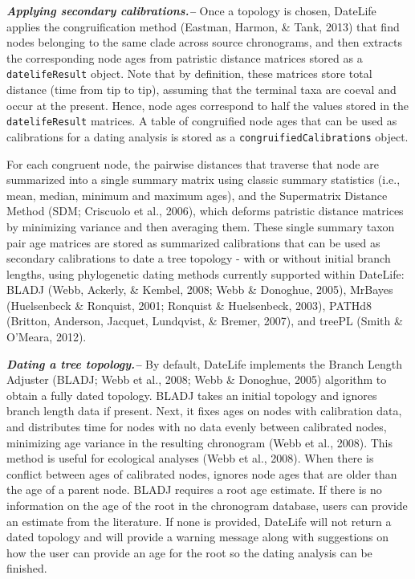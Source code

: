 \documentclass[english,man]{apa6}
\begin{document}
\emph{\textbf{Applying secondary calibrations.--}}
Once a topology is chosen, DateLife applies the congruification method (Eastman, Harmon, \& Tank, 2013) that find nodes belonging to the same clade across source chronograms, and then extracts the corresponding node ages from patristic distance matrices stored as a \texttt{datelifeResult} object. Note that by definition, these matrices store total distance (time from tip to tip), assuming that the terminal taxa are coeval and occur at the present. Hence, node ages correspond to half the values stored in the \texttt{datelifeResult} matrices.
A table of congruified node ages that can be used as calibrations for a dating analysis is stored as a \texttt{congruifiedCalibrations} object.

For each congruent node, the pairwise distances that traverse that node are summarized into a single summary matrix using classic summary statistics (i.e., mean, median, minimum and maximum ages), and the Supermatrix Distance Method (SDM; Criscuolo et al., 2006), which deforms patristic distance matrices by minimizing variance and then averaging them.
These single summary taxon pair age matrices are stored as summarized calibrations that can be used as secondary calibrations to date a tree topology - with or without initial branch lengths, using phylogenetic dating methods currently supported within DateLife: BLADJ (Webb, Ackerly, \& Kembel, 2008; Webb \& Donoghue, 2005), MrBayes (Huelsenbeck \& Ronquist, 2001; Ronquist \& Huelsenbeck, 2003), PATHd8 (Britton, Anderson, Jacquet, Lundqvist, \& Bremer, 2007), and treePL (Smith \& O'Meara, 2012).

\emph{\textbf{Dating a tree topology.--}}
By default, DateLife implements the Branch Length Adjuster (BLADJ; Webb et al., 2008; Webb \& Donoghue, 2005) algorithm to obtain a fully dated topology.
BLADJ takes an initial topology and ignores branch length data if present. Next, it fixes ages on nodes with calibration data, and distributes time for nodes with no data evenly between calibrated nodes, minimizing age variance in the resulting chronogram (Webb et al., 2008). This method is useful for ecological analyses (Webb et al., 2008).
When there is conflict between ages of calibrated nodes, ignores node ages that are older than the age of a parent node.
BLADJ requires a root age estimate. If there is no information on the age of the root in the chronogram database, users can provide an estimate from the literature. If none is provided, DateLife will not return a dated topology and will provide a warning message along with suggestions on how the user can provide an age for the root so the dating analysis can be finished.
\end{document}
